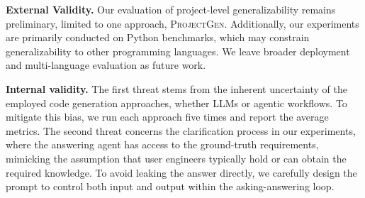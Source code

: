 \noindent\textbf{External Validity.} Our evaluation of project-level generalizability remains preliminary, limited to one approach, \textsc{ProjectGen}. Additionally, our experiments are primarily conducted on Python benchmarks, which may constrain generalizability to other programming languages. We leave broader deployment and multi-language evaluation as future work.

\noindent\textbf{Internal validity.} The first threat stems from the inherent uncertainty of the employed code generation approaches, whether LLMs or agentic workflows. To mitigate this bias, we run each approach five times and report the average metrics. The second threat concerns the clarification process in our experiments, where the answering agent has access to the ground-truth requirements, mimicking the assumption that user engineers typically hold or can obtain the required knowledge. To avoid leaking the answer directly, we carefully design the prompt to control both input and output within the asking-answering loop.
